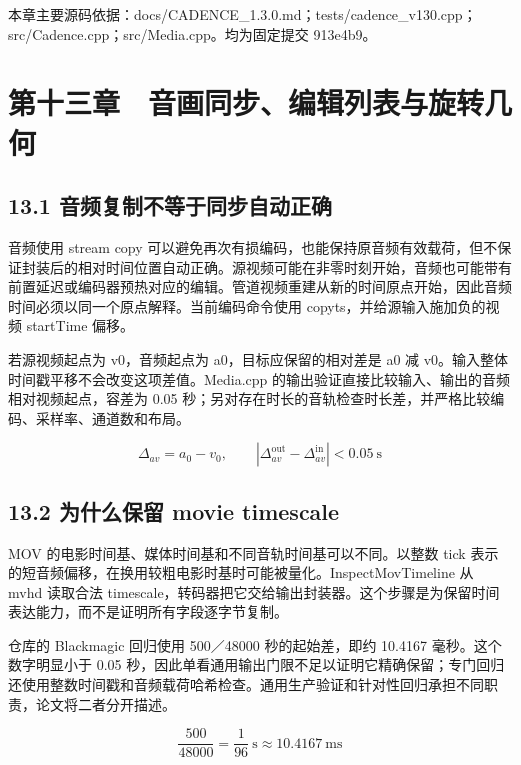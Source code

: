 \documentclass[UTF8,zihao=-4,openany]{ctexbook}
\begin{document}
\par\small 本章主要源码依据：docs/CADENCE\_1.3.0.md；tests/cadence\_v130.cpp；src/Cadence.cpp；src/Media.cpp。均为固定提交 913e4b9。\normalsize

\chapter*{第十三章　音画同步、编辑列表与旋转几何}

\section*{13.1 音频复制不等于同步自动正确}
音频使用 stream copy 可以避免再次有损编码，也能保持原音频有效载荷，但不保证封装后的相对时间位置自动正确。源视频可能在非零时刻开始，音频也可能带有前置延迟或编码器预热对应的编辑。管道视频重建从新的时间原点开始，因此音频时间必须以同一个原点解释。当前编码命令使用 copyts，并给源输入施加负的视频 startTime 偏移。

若源视频起点为 v0，音频起点为 a0，目标应保留的相对差是 a0 减 v0。输入整体时间戳平移不会改变这项差值。Media.cpp 的输出验证直接比较输入、输出的音频相对视频起点，容差为 0.05 秒；另对存在时长的音轨检查时长差，并严格比较编码、采样率、通道数和布局。


\begin{equation}
\Delta_{av}=a_0-v_0,\qquad |\Delta_{av}^{\mathrm{out}}-\Delta_{av}^{\mathrm{in}}|<0.05\ \mathrm{s}
\end{equation}

\section*{13.2 为什么保留 movie timescale}
MOV 的电影时间基、媒体时间基和不同音轨时间基可以不同。以整数 tick 表示的短音频偏移，在换用较粗电影时基时可能被量化。InspectMovTimeline 从 mvhd 读取合法 timescale，转码器把它交给输出封装器。这个步骤是为保留时间表达能力，而不是证明所有字段逐字节复制。

仓库的 Blackmagic 回归使用 500／48000 秒的起始差，即约 10.4167 毫秒。这个数字明显小于 0.05 秒，因此单看通用输出门限不足以证明它精确保留；专门回归还使用整数时间戳和音频载荷哈希检查。通用生产验证和针对性回归承担不同职责，论文将二者分开描述。


\begin{equation}
\frac{500}{48000}=\frac{1}{96}\ \mathrm{s}\approx10.4167\ \mathrm{ms}
\end{equation}
\end{document}
